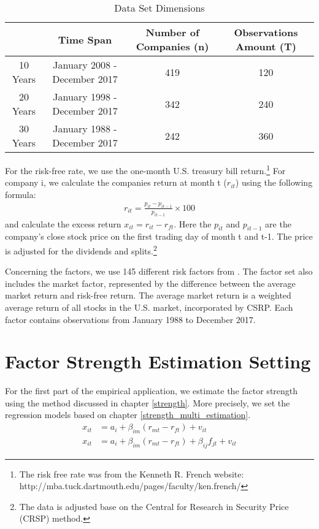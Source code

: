 \begin{table}[H]
	\centering
		\caption{Data Set Dimensions}
			\label{Data_set}
	\begin{tabular}{c|ccc}
		\hline
		& Time Span                    & Number of Companies (n) & Observations Amount (T) \\ \hline
		10 Years & January 2008 - December 2017 & 419                  & 120                     \\
		20 Years & January 1998 - December 2017 & 342                  & 240                     \\
		30 Years & January 1988 - December 2017 & 242                  & 360                     \\ \hline
	\end{tabular}
\end{table}
For the risk-free rate, we use the one-month U.S. treasury bill return.\footnote{ The risk free rate was from the Kenneth R. French website: http://mba.tuck.dartmouth.edu/pages/faculty/ken.french/}
For company i, we calculate the companies return at month t ($r_{it}$) using the following formula:
\begin{align*}
r_{it} = \frac{p_{i t} - p_{i t-1}}{p_{i t-1}}\times 100
\end{align*}
and calculate the excess return $x_{it} = r_{it} - r_{ft}$.
Here the $p_{it}$ and $p_{i t-1}$ are the company's close stock price on the first trading day of month t and t-1.
The price is adjusted for the dividends and splits.\footnote{The data is adjusted base on the Central for Research in Security Price (CRSP) method.}

Concerning the factors, we use 145 different risk factors from .
The factor set also includes the market factor, represented by the difference between the average market return and risk-free return.
The average market return is a weighted average return of all stocks in the U.S. market, incorporated by CSRP.
Each factor contains observations from January 1988 to December 2017.

\section{Factor Strength Estimation Setting}
For the first part of the empirical application, we estimate the factor strength using the method discussed in chapter \ref{strength}.
More precisely, we set the regression models based on chapter \ref{strength_multi_estimation}.
\begin{align*}
  x_{it} &= a_i + \beta_{im}(r_{mt} - r_{ft}) + v_{it} \\
 x_{it} &= a_i + \beta_{im}(r_{mt} - r_{ft}) + \beta_{ij}f_{jt} + v_{it} 
\end{align*}

